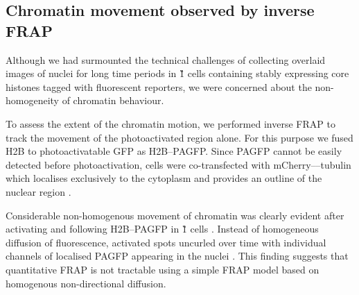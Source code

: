 

    \subsection{Chromatin movement observed by inverse FRAP}

    Although we had surmounted the technical challenges of collecting
    overlaid images of nuclei for long time periods
    in \G1{} cells containing stably expressing
    core histones tagged with fluorescent reporters,
    we were concerned about the non-homogeneity of chromatin behaviour.

    To assess the extent of the chromatin motion,
    we performed inverse FRAP
    to track the movement of the photoactivated region alone.
    For this purpose we fused H2B to photoactivatable GFP as H2B--PAGFP.
    Since PAGFP cannot be easily detected before photoactivation,
    cells were co-transfected with mCherry--\textalpha--tubulin
    which localises exclusively to the cytoplasm
    and provides an outline of the nuclear region
    .

    Considerable non-homogenous movement of chromatin was clearly evident
    after activating and following H2B--PAGFP in
    \G1{} cells .
    Instead of homogeneous diffusion of fluorescence,
    activated spots uncurled over time with individual channels of
    localised PAGFP appearing in the nuclei .
    This finding suggests that quantitative FRAP is not tractable using
    a simple FRAP model based on homogenous non-directional diffusion.

